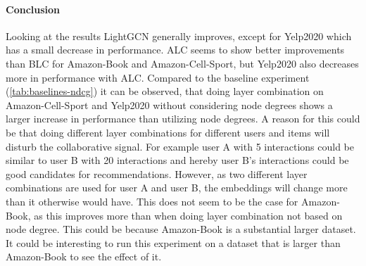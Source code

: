 \paragraph{Conclusion}
Looking at the results LightGCN generally improves, except for Yelp2020 which has a small decrease in performance.
ALC seems to show better improvements than BLC for Amazon-Book and Amazon-Cell-Sport, but Yelp2020 also decreases more in performance with ALC.
Compared to the baseline experiment (\autoref{tab:baselines-ndcg}) it can be observed, that doing layer combination on Amazon-Cell-Sport and Yelp2020 without considering node degrees shows a larger increase in performance than utilizing node degrees.
A reason for this could be that doing different layer combinations for different users and items will disturb the collaborative signal.
For example user A with 5 interactions could be similar to user B with 20 interactions and hereby user B's interactions could be good candidates for recommendations.
However, as two different layer combinations are used for user A and user B, the embeddings will change more than it otherwise would have.
This does not seem to be the case for Amazon-Book, as this improves more than when doing layer combination not based on node degree.
This could be because Amazon-Book is a substantial larger dataset. 
It could be interesting to run this experiment on a dataset that is larger than Amazon-Book to see the effect of it.